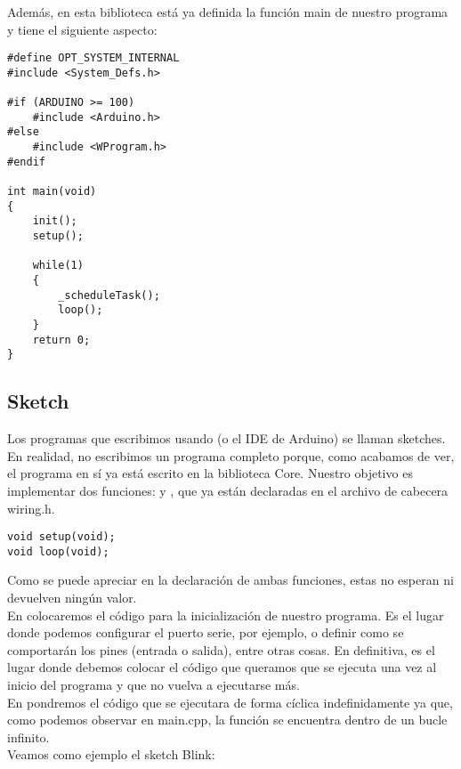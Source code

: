 Además, en esta biblioteca está ya definida la función main de nuestro programa y tiene el siguiente aspecto:
\lstset{language=C++}
\begin{lstlisting}[caption=main.cpp]
#define OPT_SYSTEM_INTERNAL
#include <System_Defs.h>

#if (ARDUINO >= 100)
	#include <Arduino.h>
#else
	#include <WProgram.h>
#endif

int main(void)
{
	init();
	setup();
	
	while(1)
	{
		_scheduleTask();
		loop();
	}
	return 0;
}
\end{lstlisting}

\subsection{Sketch}
Los programas que escribimos usando  (o el IDE de Arduino) se llaman sketches. En realidad, no escribimos un programa completo porque, como acabamos de ver, el programa en sí ya está escrito en la biblioteca Core. Nuestro objetivo es implementar dos funciones:  y , que ya están declaradas en el archivo de cabecera wiring.h.\\
\begin{lstlisting}[caption=Sección de wiring.h]
void setup(void);
void loop(void);
\end{lstlisting}

Como se puede apreciar en la declaración de ambas funciones, estas no esperan ni devuelven ningún valor.\\

En  colocaremos el código para la inicialización de nuestro programa. Es el lugar donde podemos configurar el puerto serie, por ejemplo, o definir como se comportarán los pines (entrada o salida), entre otras cosas. En definitiva, es el lugar donde debemos colocar el código que queramos que se ejecuta una vez al inicio del programa y que no vuelva a ejecutarse más.\\
En  pondremos el código que se ejecutara de forma cíclica indefinidamente ya que, como podemos observar en main.cpp, la función  se encuentra dentro de un bucle infinito.\\

Veamos como ejemplo el sketch Blink:


